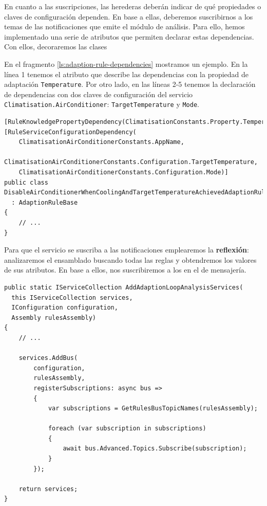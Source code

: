En cuanto a las suscripciones, las herederas deberán indicar de qué propiedades o claves de configuración dependen. En base a ellas, deberemos suscribirnos a los temas de las notificaciones que emite el módulo de análisis. Para ello, hemos implementado una serie de atributos que permiten declarar estas dependencias. Con ellos, decoraremos las clases

En el fragmento \ref{ls:adaption-rule-dependencies} mostramos un ejemplo. En la línea 1 tenemos el atributo que describe las dependencias con la propiedad de adaptación \texttt{Temperature}. Por otro lado, en las líneas 2-5 tenemos la declaración de dependencias con dos claves de configuración del servicio \texttt{Climatisation.AirConditioner}: \texttt{TargetTemperature} y \texttt{Mode}.

\begin{lstlisting}[language={[Sharp]C},caption={Las reglas declaran sus dependencias sobre propiedades de adaptación usando atributos. Estos se utilizarán para las suscripciones a los temas de los eventos.},captionpos=b, label=ls:adaption-rule-dependencies]
[RuleKnowledgePropertyDependency(ClimatisationConstants.Property.Temperature)]
[RuleServiceConfigurationDependency(
    ClimatisationAirConditionerConstants.AppName,
    ClimatisationAirConditionerConstants.Configuration.TargetTemperature,
    ClimatisationAirConditionerConstants.Configuration.Mode)]
public class DisableAirConditionerWhenCoolingAndTargetTemperatureAchievedAdaptionRule
  : AdaptionRuleBase
{
    // ...
}
\end{lstlisting}

Para que el servicio se suscriba a las notificaciones emplearemos la \textbf{reflexión}: analizaremos el ensamblado buscando todas las reglas y obtendremos los valores de sus atributos. En base a ellos, nos suscribiremos a los  en el  de mensajería.

\begin{lstlisting}[language={[Sharp]C},caption={Para suscribirnos a los \foreign{english}{topics} de las notificaciones obtenemos las dependencias de las reglas mediante reflexión.},captionpos=b, label=ls:rules-registration]
public static IServiceCollection AddAdaptionLoopAnalysisServices(
  this IServiceCollection services,
  IConfiguration configuration,
  Assembly rulesAssembly)
{
    // ...

    services.AddBus(
        configuration,
        rulesAssembly,
        registerSubscriptions: async bus =>
        {
            var subscriptions = GetRulesBusTopicNames(rulesAssembly);

            foreach (var subscription in subscriptions)
            {
                await bus.Advanced.Topics.Subscribe(subscription);
            }
        });

    return services;
}
\end{lstlisting}

